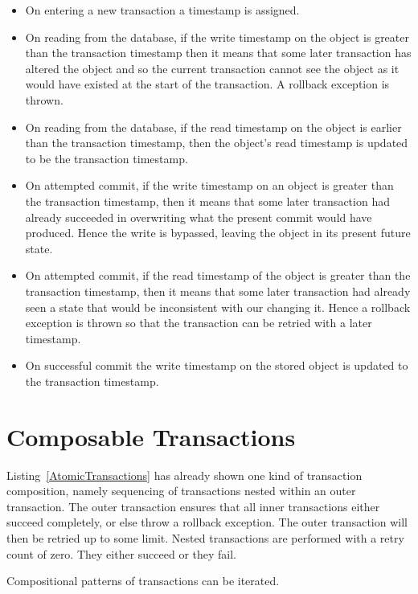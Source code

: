 \documentclass[article,oneside]{memoir}
\begin{document}
\begin{itemize}
\item On entering a new transaction a timestamp is assigned.

\item On reading from the database, if the write timestamp on the object is greater than the transaction timestamp then it means that some later transaction has altered the object and so the current transaction cannot see the object as it would have existed at the start of the transaction. A rollback exception is thrown.

\item On reading from the database, if the read timestamp on the object is earlier than the transaction timestamp, then the object's read timestamp is updated to be the transaction timestamp.

\item On attempted commit, if the write timestamp on an object is greater than the transaction timestamp, then it means that some later transaction had already succeeded in overwriting what the present commit would have produced. Hence the write is bypassed, leaving the object in its present future state.

\item On attempted commit, if the read timestamp of the object is greater than the transaction timestamp, then it means that some later transaction had already seen a state that would be inconsistent with our changing it. Hence a rollback exception is thrown so that the transaction can be retried with a later timestamp.

\item On successful commit the write timestamp on the stored object is updated to the transaction timestamp.
\end{itemize}
\section{Composable Transactions}
Listing~\ref{AtomicTransactions} has already shown one kind of transaction composition, namely sequencing of transactions nested within an outer transaction. The outer transaction ensures that all inner transactions either succeed completely, or else throw a rollback exception. The outer transaction will then be retried up to some limit. Nested transactions are performed with a retry count of zero. They either succeed or they fail.

Compositional patterns of transactions can be iterated.
\end{document}
